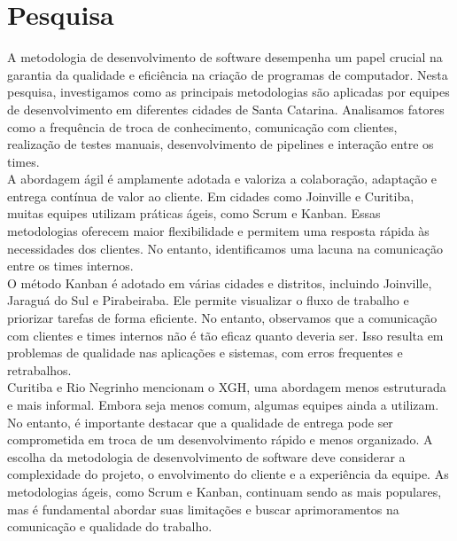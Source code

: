 \documentclass[12pt]{article}
\begin{document}
\section{Pesquisa}

 A metodologia de desenvolvimento de software desempenha um papel crucial na garantia da qualidade e eficiência na criação de programas de computador. Nesta pesquisa, investigamos como as principais metodologias são aplicadas por equipes de desenvolvimento em diferentes cidades de Santa Catarina. Analisamos fatores como a frequência de troca de conhecimento, comunicação com clientes, realização de testes manuais, desenvolvimento de pipelines e interação entre os times.
\\ A abordagem ágil é amplamente adotada e valoriza a colaboração, adaptação e entrega contínua de valor ao cliente. Em cidades como Joinville e Curitiba, muitas equipes utilizam práticas ágeis, como Scrum e Kanban. Essas metodologias oferecem maior flexibilidade e permitem uma resposta rápida às necessidades dos clientes. No entanto, identificamos uma lacuna na comunicação entre os times internos.
\\O método Kanban é adotado em várias cidades e distritos, incluindo Joinville, Jaraguá do Sul e Pirabeiraba. Ele permite visualizar o fluxo de trabalho e priorizar tarefas de forma eficiente. No entanto, observamos que a comunicação com clientes e times internos não é tão eficaz quanto deveria ser. Isso resulta em problemas de qualidade nas aplicações e sistemas, com erros frequentes e retrabalhos.
\\Curitiba e Rio Negrinho mencionam o XGH, uma abordagem menos estruturada e mais informal. Embora seja menos comum, algumas equipes ainda a utilizam. No entanto, é importante destacar que a qualidade de entrega pode ser comprometida em troca de um desenvolvimento rápido e menos organizado.
A escolha da metodologia de desenvolvimento de software deve considerar a complexidade do projeto, o envolvimento do cliente e a experiência da equipe. As metodologias ágeis, como Scrum e Kanban, continuam sendo as mais populares, mas é fundamental abordar suas limitações e buscar aprimoramentos na comunicação e qualidade do trabalho.
\end{document}
